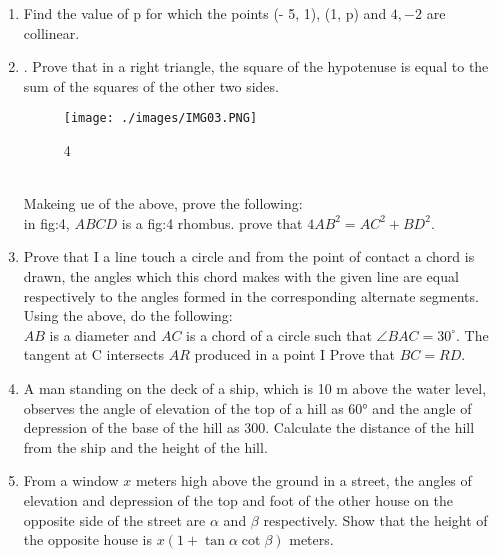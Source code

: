 \documentclass{article}                                                                                   \usepackage{amsmath, amssymb}
\begin{document}
\begin{enumerate}
\item Find the value of p for which the points (- 5, 1), (1, p) and \(4, - 2\) are collinear.
\item . Prove that in a right triangle, the square of the hypotenuse is equal to the sum of the
squares of the other two sides.
\begin{figure}[h]
        \centering
          \texttt{[image: ./images/IMG03.PNG]}
          \caption{4}                                                                                                                                             \label{fig:}

 \end{figure}\\
Makeing  ue  of the above, prove the following:\\
in fig:4, $ABCD$ is a fig:4 rhombus. prove that $4AB^2 =  AC^2 +BD^2$.


\item Prove that I a line touch a circle and from the point of contact a chord is drawn, the angles
which this chord makes with the given line are equal respectively to the angles formed in the
corresponding alternate segments.
Using the above, do the following: \\
$AB$ is a diameter and $AC$ is a chord of a circle such that $\angle BAC=30^\circ$. The tangent at C
intersects $AR$ produced in a point I Prove that $BC = RD.$

\item A man standing on the deck of a ship, which is 10 m above the water level, observes the
angle of elevation of the top of a hill as 60° and the angle of depression of the base of the hill as
300. Calculate the distance of the hill from the ship and the height of the hill.

\item From a window $x$ meters high above the ground in a street, the angles of elevation and depression of the top and foot of the other house on the opposite side of the street are $\alpha$ and $\beta$ respectively. Show that the height of the opposite house is $x(1 + \tan \alpha \cot \beta)$ meters.






\end{enumerate}
\end{document}
